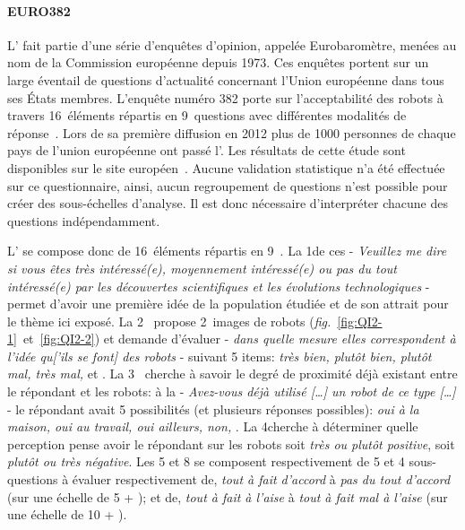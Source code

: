     \paragraph{EURO382}\label{q:euro}
    L' fait partie d’une série d’enquêtes d’opinion, appelée Eurobaromètre, menées au nom de la Commission européenne depuis 1973. Ces enquêtes portent sur un large éventail de questions d’actualité concernant l’Union européenne dans tous ses États membres. L’enquête numéro 382 porte sur l’acceptabilité des robots à travers 16~éléments répartis en 9~questions avec différentes modalités de réponse~. Lors de sa première diffusion en 2012 plus de 1000 personnes de chaque pays de l’union européenne ont passé l'. Les résultats de cette étude sont disponibles sur le site européen~. Aucune validation statistique n'a été effectuée sur ce questionnaire, ainsi, aucun regroupement de questions n'est possible pour créer des sous-échelles d'analyse. Il est donc nécessaire d'interpréter chacune des questions indépendamment.\par%
    L' se compose donc de 16~éléments répartis en 9~. La 1\iere de ces  - \textit{Veuillez me dire si vous êtes très intéressé(e), moyennement intéressé(e) ou pas du tout intéressé(e) par les découvertes scientifiques et les évolutions technologiques} - permet d'avoir une première idée de la population étudiée et de son attrait pour le thème ici exposé.
    La 2\ieme~ propose 2~images de robots (\textit{fig.}~\ref{fig:QI2-1}~et~\ref{fig:QI2-2}) et demande d'évaluer - \textit{dans quelle mesure elles correspondent à l’idée qu['ils se font] des robots} - suivant 5 items: \textit{très bien, plutôt bien, plutôt mal, très mal,} et .
    La 3\ieme~ cherche à savoir le degré de proximité déjà existant entre le répondant et les robots: à la  - \textit{Avez-vous déjà utilisé [\dots] un robot de ce type [\dots]} - le répondant avait 5 possibilités (et plusieurs réponses possibles): \textit{oui à la maison, oui au travail, oui ailleurs, non, }.
    La 4\ieme cherche à déterminer quelle perception pense avoir le répondant sur les robots soit \textit{très ou plutôt positive}, soit \textit{plutôt ou très négative}.
    Les 5 et 8 se composent respectivement de 5 et 4 sous-questions à évaluer respectivement de, \textit{tout à fait d'accord} à \textit{pas du tout d'accord} (sur une échelle de 5 + ); et de, \textit{tout à fait à l'aise} à \textit{tout à fait mal à l'aise} (sur une échelle de 10 + ). 
